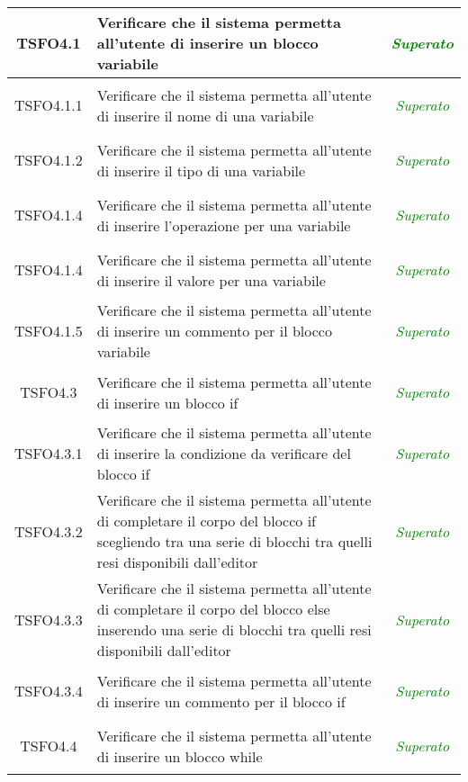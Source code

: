 \begin{longtable}{|c|>{}m{8cm}|c|}
\hypertarget{TSFO4.1}{TSFO4.1} & Verificare che il sistema permetta all'utente di inserire un blocco variabile & \textcolor{Green}{\textit{Superato}}\\ \hline
\hypertarget{TSFO4.1.1}{TSFO4.1.1} & Verificare che il sistema permetta all'utente di inserire il nome di una variabile & \textcolor{Green}{\textit{Superato}}\\ \hline
\hypertarget{TSFO4.1.2}{TSFO4.1.2} & Verificare che il sistema permetta all'utente di inserire il tipo di una variabile& \textcolor{Green}{\textit{Superato}}\\ \hline
\hypertarget{TSFO4.1.3}{TSFO4.1.4} & Verificare che il sistema permetta all'utente di inserire l'operazione per una variabile& \textcolor{Green}{\textit{Superato}}\\ \hline
\hypertarget{TSFO4.1.4}{TSFO4.1.4} & Verificare che il sistema permetta all'utente di inserire il valore per una variabile& \textcolor{Green}{\textit{Superato}}\\ \hline
\hypertarget{TSFO4.1.5}{TSFO4.1.5} & Verificare che il sistema permetta all'utente di inserire un commento per il blocco variabile & \textcolor{Green}{\textit{Superato}}\\ \hline
\hypertarget{TSFO4.3}{TSFO4.3} & Verificare che il sistema permetta all'utente di inserire un blocco if & \textcolor{Green}{\textit{Superato}}\\ \hline
\hypertarget{TSFO4.3.1}{TSFO4.3.1} & Verificare che il sistema permetta all'utente di inserire la condizione da verificare del blocco if & \textcolor{Green}{\textit{Superato}}\\ \hline
\hypertarget{TSFO4.3.2}{TSFO4.3.2} & Verificare che il sistema permetta all'utente di completare il corpo del blocco if scegliendo tra una serie di blocchi tra quelli resi disponibili dall'editor & \textcolor{Green}{\textit{Superato}}\\ \hline
\hypertarget{TSFO4.3.3}{TSFO4.3.3} & Verificare che il sistema permetta all'utente di completare il corpo del blocco else inserendo una serie di blocchi tra quelli resi disponibili dall'editor & \textcolor{Green}{\textit{Superato}}\\ \hline
\hypertarget{TSFO4.3.4}{TSFO4.3.4} & Verificare che il sistema permetta all'utente di inserire un commento per il blocco if & \textcolor{Green}{\textit{Superato}}\\ \hline
\hypertarget{TSFO4.4}{TSFO4.4} & Verificare che il sistema permetta all'utente di inserire un blocco while & \textcolor{Green}{\textit{Superato}}\\ \hline

\end{longtable}
